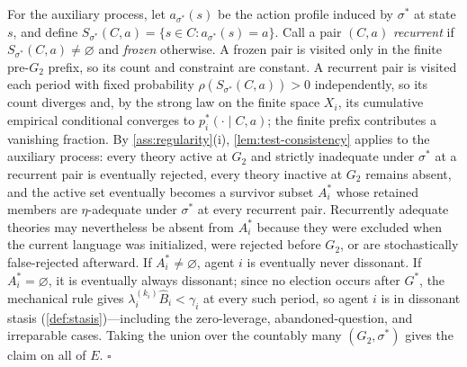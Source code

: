 \documentclass[11pt]{article}
\theoremstyle{definition}
\newcommand{\emptysetset}{\varnothing}
\begin{document}
For the auxiliary process, let $a_{\sigma^{*}}(s)$ be the action profile induced by $\sigma^{*}$ at state $s$, and define $S_{\sigma^{*}}(C,a)=\{s\in C:a_{\sigma^{*}}(s)=a\}$.
Call a pair $(C,a)$ \emph{recurrent} if $S_{\sigma^{*}}(C,a)\neq\emptysetset$ and \emph{frozen} otherwise.
A frozen pair is visited only in the finite pre-$G_2$ prefix, so its count and constraint are constant.
A recurrent pair is visited each period with fixed probability $\rho(S_{\sigma^{*}}(C,a))>0$ independently, so its count diverges and, by the strong law on the finite space $X_i$, its cumulative empirical conditional converges to $p_i^{*}(\cdot\mid C,a)$; the finite prefix contributes a vanishing fraction.
By \cref{ass:regularity}(i), \cref{lem:test-consistency} applies to the auxiliary process: every theory active at $G_2$ and strictly inadequate under $\sigma^{*}$ at a recurrent pair is eventually rejected, every theory inactive at $G_2$ remains absent, and the active set eventually becomes a survivor subset $A_i^{*}$ whose retained members are $\eta$-adequate under $\sigma^{*}$ at every recurrent pair.
Recurrently adequate theories may nevertheless be absent from $A_i^{*}$ because they were excluded when the current language was initialized, were rejected before $G_2$, or are stochastically false-rejected afterward.
If $A_i^{*}\neq\emptysetset$, agent $i$ is eventually never dissonant.
If $A_i^{*}=\emptysetset$, it is eventually always dissonant; since no election occurs after $G^{*}$, the mechanical rule gives $\lambda_i^{(k_i)}\widehat B_i<\gamma_i$ at every such period, so agent $i$ is in dissonant stasis (\cref{def:stasis})---including the zero-leverage, abandoned-question, and irreparable cases.
Taking the union over the countably many $(G_2,\sigma^{*})$ gives the claim on all of $E$.
\hfill$\square$
\end{document}
